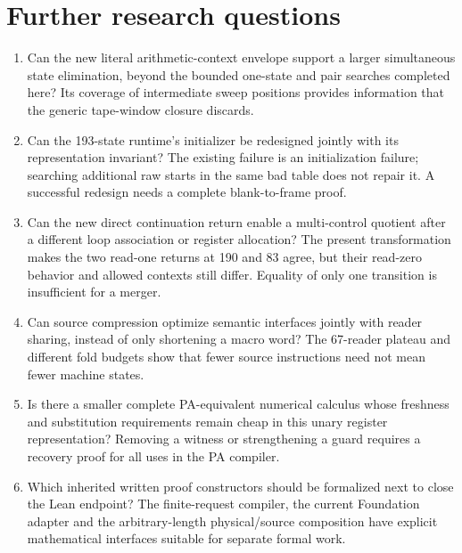 \documentclass[11pt,letterpaper]{article}
\begin{document}
\section{Further research questions}
\begin{enumerate}
\item Can the new literal arithmetic-context envelope support a larger
simultaneous state elimination, beyond the bounded one-state and pair
searches completed here? Its coverage of intermediate sweep positions
provides information that the generic tape-window closure discards.
\item Can the 193-state runtime's initializer be redesigned jointly with
its representation invariant? The existing failure is an initialization
failure; searching additional raw starts in the same bad table does not
repair it. A successful redesign needs a complete blank-to-frame proof.
\item Can the new direct continuation return enable a multi-control
quotient after a different loop association or register allocation? The
present transformation makes the two read-one returns at 190 and 83 agree,
but their read-zero behavior and allowed contexts still differ. Equality
of only one transition is insufficient for a merger.
\item Can source compression optimize semantic interfaces jointly with
reader sharing, instead of only shortening a macro word? The 67-reader
plateau and different fold budgets show that fewer source instructions
need not mean fewer machine states.
\item Is there a smaller complete PA-equivalent numerical calculus whose
freshness and substitution requirements remain cheap in this unary
register representation? Removing a witness or strengthening a guard
requires a recovery proof for all uses in the PA compiler.
\item Which inherited written proof constructors should be formalized
next to close the Lean endpoint? The finite-request compiler, the current
Foundation adapter and the arbitrary-length physical/source composition
have explicit mathematical interfaces suitable for separate formal work.
\end{enumerate}
\end{document}
